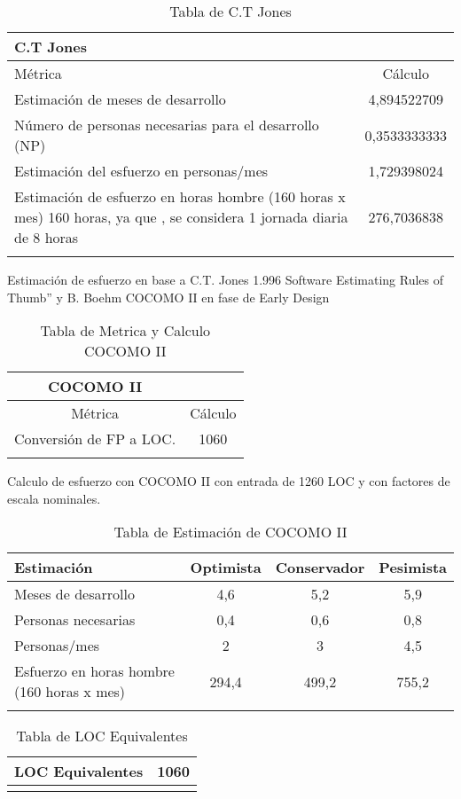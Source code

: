 \begin{longtable}{|p{8cm}|c|}
\hline 
C.T Jones &   \\ 
\hline 
Métrica  & Cálculo \\ 
\hline 
Estimación de meses de desarrollo & 4,894522709 \\ 
\hline 
Número de personas necesarias para el desarrollo (NP) & 0,3533333333 \\ 
\hline 
Estimación del esfuerzo en personas/mes  & 1,729398024 \\ 
\hline 
Estimación de esfuerzo en horas hombre (160 horas x mes) 160 horas, ya que
, se considera 1 jornada diaria de 8 horas & 276,7036838 \\ 
\hline 
\caption{Tabla de C.T Jones}
\label{tab12}
\end{longtable} 

Estimación de esfuerzo en base a C.T. Jones 1.996 Software Estimating Rules of Thumb” y B. Boehm COCOMO II en fase de Early Design

\begin{longtable}{|c|c|}
\hline 
COCOMO II &   \\ 
\hline 
Métrica  & Cálculo \\ 
\hline 
Conversión de FP a LOC. & 1060 \\ 
\hline 
\caption{Tabla de Metrica y Calculo COCOMO II}
\label{tab13}
\end{longtable}

Calculo de esfuerzo con COCOMO II con entrada de 1260 LOC y con factores de escala nominales.

\begin{longtable}{|p{3cm}|c|c|c|}
 \hline 
 Estimación & Optimista & Conservador & Pesimista \\ 
 \hline 
 Meses de desarrollo & 4,6 & 5,2 & 5,9 \\ 
 \hline 
 Personas necesarias & 0,4 & 0,6 & 0,8 \\ 
 \hline 
 Personas/mes & 2 & 3 & 4,5 \\ 
 \hline 
 Esfuerzo en horas hombre (160 horas x mes) & 294,4 & 499,2 & 755,2 \\ 
 \hline 
 \caption{Tabla de Estimación de COCOMO II}
\label{tab14}
 \end{longtable}
 
\begin{longtable}{|c|c|}
  \hline 
  LOC Equivalentes & 1060 \\ 
  \hline 
 \caption{Tabla de LOC Equivalentes}
\label{tab15}
\end{longtable}

